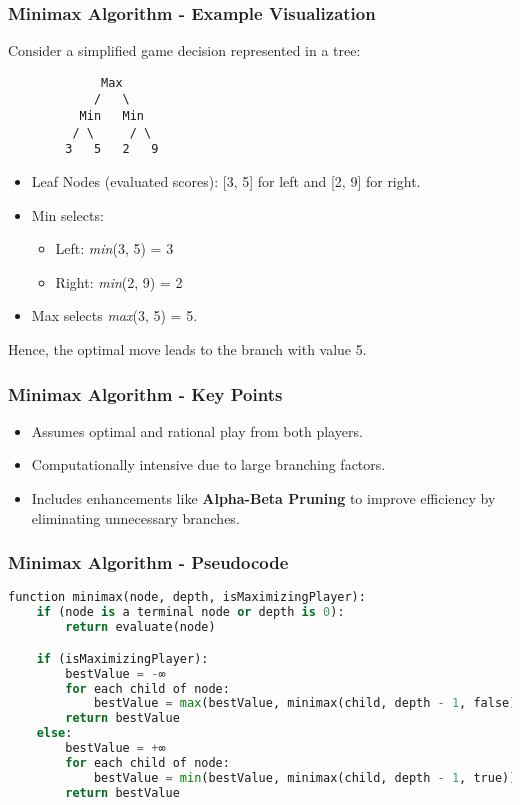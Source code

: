 \documentclass[aspectratio=169]{beamer}
\begin{document}
\begin{frame}[fragile]
    \frametitle{Minimax Algorithm - Example Visualization}
    Consider a simplified game decision represented in a tree:
    \begin{center}
    \begin{verbatim}
             Max
            /   \
          Min   Min
         / \     / \
        3   5   2   9
    \end{verbatim}
    \end{center}
    
    \begin{itemize}
        \item Leaf Nodes (evaluated scores): [3, 5] for left and [2, 9] for right.
        \item Min selects:
        \begin{itemize}
            \item Left: \textit{min}(3, 5) = 3
            \item Right: \textit{min}(2, 9) = 2
        \end{itemize}
        \item Max selects \textit{max}(3, 5) = 5.
    \end{itemize}
    Hence, the optimal move leads to the branch with value 5.
\end{frame}

\begin{frame}[fragile]
    \frametitle{Minimax Algorithm - Key Points}
    \begin{itemize}
        \item Assumes optimal and rational play from both players.
        \item Computationally intensive due to large branching factors.
        \item Includes enhancements like \textbf{Alpha-Beta Pruning} to improve efficiency by eliminating unnecessary branches.
    \end{itemize}
\end{frame}

\begin{frame}[fragile]
    \frametitle{Minimax Algorithm - Pseudocode}
    \begin{lstlisting}[language=Python]
function minimax(node, depth, isMaximizingPlayer):
    if (node is a terminal node or depth is 0):
        return evaluate(node)

    if (isMaximizingPlayer):
        bestValue = -∞
        for each child of node:
            bestValue = max(bestValue, minimax(child, depth - 1, false))
        return bestValue
    else:
        bestValue = +∞
        for each child of node:
            bestValue = min(bestValue, minimax(child, depth - 1, true))
        return bestValue
    \end{lstlisting}
\end{frame}
\end{document}
